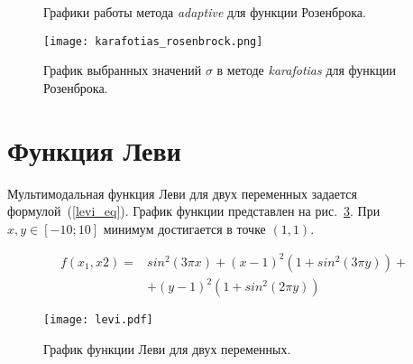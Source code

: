 \begin{figure}
  \centering
  \caption{ Графики работы метода \textit{adaptive} для функции Розенброка.}
  \label{adaptive_rosenbrock_plot}
\end{figure}

\begin{figure}
  \centering
  \texttt{[image: karafotias\_rosenbrock.png]}
  \caption{График выбранных значений $\sigma$ в методе \textit{karafotias} для функции Розенброка.}
  \label{karafotias_rosenbrock}
\end{figure}

\section{Функция Леви}

Мультимодальная функция Леви для двух переменных задается формулой~(\ref{levi_eq}). График функции представлен на рис.~\ref{levi_plot}. При $x, y \in [-10; 10]$ минимум достигается в точке $(1, 1)$.

\begin{equation}
\label{levi_eq}
\begin{split}
f(x_1, x2) = &sin^2(3\pi x) + (x - 1)^2(1 + sin^2(3\pi y)) + \\
& + (y - 1)^2(1 + sin^2(2\pi y))
\end{split}
\end{equation}

\begin{figure}
    \centering
    \texttt{[image: levi.pdf]}
    \caption{График функции Леви для двух переменных.}
    \label{levi_plot}
\end{figure}

